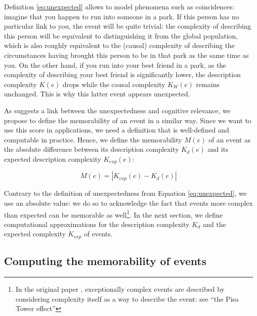 \documentclass[entropy,article,submit,moreauthors,pdftex]{Definitions/mdpi}
\begin{document}
Definition \ref{eq:unexpected} allows to model phenomena
such as coincidences: imagine that you happen to run into someone in a park.
If this person has no particular link to you, the event will be quite
trivial: the complexity of describing this person will be equivalent to
distinguishing it from the global population, which is also roughly
equivalent to the (causal) complexity of describing the circumstances having brought this person to be in
that park as the same time as you. On the other hand, if you run into your best friend in
a park, as the complexity of describing your best friend is significantly
lower, the description complexity $K(e)$ drops while the causal complexity
$K_W (e)$ remains unchanged. This is why this latter  event appears unexpected.

As \cite{dessalles2011coincidences} suggests a link between the unexpectedness and cognitive relevance, we propose to define the memorability of an event in a similar way. Since we want to use this score in applications, we need a definition that is well-defined and computable in practice.
Hence, we define the memorability $M(e)$ of an event as the absolute difference between its description complexity $K_d(e)$ and its expected description complexity $K_{exp}(e)$:

\begin{equation}
    \label{eq:memorability}
    M(e) = |K_{exp}(e) - K_d(e)|
\end{equation}

Contrary to the definition of unexpectedness from Equation \ref{eq:unexpected}, we use an absolute value: we do so to acknowledge the fact that events more complex than expected can be memorable as well\footnote{In the original paper \cite{dessalles2011coincidences}, exceptionally complex events are described by considering complexity itself as a way to describe the event: see ``the Pisa Tower effect''\cite{dessalles_pisa_nodate}}. In the next section, we define computational approximations for the description complexity $K_d$ and the expected complexity $K_{exp}$ of events.

\subsection{Computing the memorability of events}
\label{sec:computing}
\end{document}
